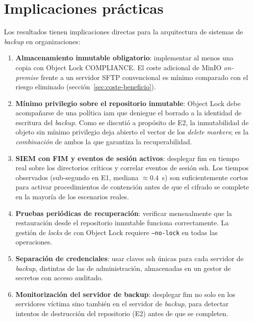 \documentclass[../main.tex]{subfiles}
\begin{document}
\section{Implicaciones prácticas}
\label{sec:implicaciones-practicas}

Los resultados tienen implicaciones directas para la arquitectura de sistemas de
\emph{backup} en organizaciones:

\begin{enumerate}
  \item \textbf{Almacenamiento inmutable obligatorio}: implementar al menos una
  copia con Object Lock COMPLIANCE. El coste adicional de MinIO \emph{on-premise}
  frente a un servidor SFTP convencional es mínimo comparado con el riesgo
  eliminado (sección~\ref{sec:coste-beneficio}).

  \item \textbf{Mínimo privilegio sobre el repositorio inmutable}: Object Lock debe
  acompañarse de una política \gls{iam} que deniegue el borrado a la identidad de
  escritura del \emph{backup}. Como se discutió a propósito de E2, la inmutabilidad
  de objeto sin mínimo privilegio deja abierto el vector de los \emph{delete
  markers}; es la \emph{combinación} de ambos la que garantiza la recuperabilidad.

  \item \textbf{SIEM con FIM y eventos de sesión activos}: desplegar \gls{fim} en
  tiempo real sobre los directorios críticos y correlar eventos de sesión \gls{ssh}.
  Los tiempos observados (sub-segundo en E1, mediana $\approx 0.4$~s) son
  suficientemente cortos para activar procedimientos de contención antes de que el
  cifrado se complete en la mayoría de los escenarios reales.

  \item \textbf{Pruebas periódicas de recuperación}: verificar mensualmente que la
  restauración desde el repositorio inmutable funciona correctamente. La gestión de
  \emph{locks} de \restic con Object Lock requiere \texttt{--no-lock} en todas las
  operaciones.

  \item \textbf{Separación de credenciales}: usar claves \gls{ssh} únicas para
  cada servidor de \emph{backup}, distintas de las de administración, almacenadas
  en un gestor de secretos con acceso auditado.

  \item \textbf{Monitorización del servidor de backup}: desplegar \gls{fim} no
  solo en los servidores víctima sino también en el servidor de \emph{backup},
  para detectar intentos de destrucción del repositorio (E2) antes de que se
  completen.
\end{enumerate}
\end{document}
